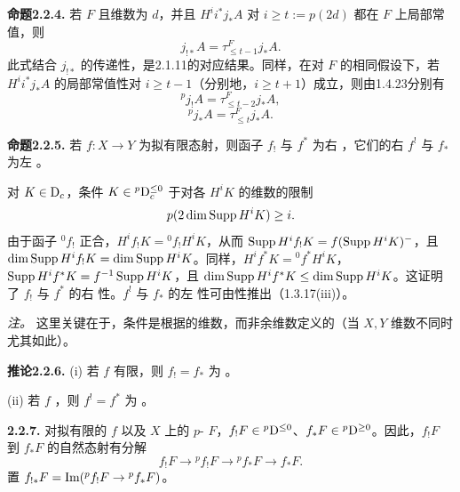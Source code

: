 \par\medskip\noindent\textbf{命题2.2.4.} 若 $F$ 且维数为 $d$，并且 $H^ii^*j_*A$ 对 $i\geq t:=p(2d)$ 都在 $F$ 上局部常值，则
\begin{equation*}
 j_{!*}A=\tau^F_{\leq t-1}j_*A.\tag{2.2.4.1}
\end{equation*}
此式结合 $j_{!*}$ 的传递性，是2.1.11的对应结果。同样，在对 $F$ 的相同假设下，若 $H^ii^*j_*A$ 的局部常值性对 $i\geq t-1$（分别地，$i\geq t+1$）成立，则由1.4.23分别有
\begin{equation*}
 {}^pj_!A=\tau^F_{\leq t-2}j_*A,\tag{2.2.4.2}
\end{equation*}
\begin{equation*}
 {}^pj_*A=\tau^F_{\leq t}j_*A.\tag{2.2.4.3}
\end{equation*}

\par\medskip\noindent\textbf{命题2.2.5.} 若 $f\colon X\to Y$ 为拟有限态射，则函子 $f_!$ 与 $f^*$ 为右 ，它们的右 $f^!$ 与 $f_*$ 为左 。

对 $K\in\mathrm{D}_c$，条件 $K\in{}^p\mathrm{D}_c^{\leq0}$ 于对各 $H^iK$ 的维数的限制
\[
 p(2\dim\operatorname{Supp} H^iK)\geq i.
\]
由于函子 ${}^0f_!$ 正合，$H^if_!K={}^0f_!H^iK$，从而 $\operatorname{Supp} H^if_!K=f(\operatorname{Supp} H^iK)^-$，且 $\dim\operatorname{Supp} H^if_!K=\dim\operatorname{Supp} H^iK$。同样，$H^if^*K={}^0f^*H^iK$，$\operatorname{Supp} H^if^*K=f^{-1}\operatorname{Supp} H^iK$，且 $\dim\operatorname{Supp} H^if^*K\leq\dim\operatorname{Supp} H^iK$。这证明了 $f_!$ 与 $f^*$ 的右 性。$f^!$ 与 $f_*$ 的左 性可由性推出（1.3.17(iii)）。

\emph{注。} 这里关键在于，条件是根据的维数，而非余维数定义的（当 $X,Y$ 维数不同时尤其如此）。

\par\medskip\noindent\textbf{推论2.2.6.} (i) 若 $f$ 有限，则 $f_!=f_*$ 为 。

(ii) 若 $f$ ，则 $f^!=f^*$ 为 。

\par\medskip\noindent\textbf{2.2.7.} 对拟有限的 $f$ 以及 $X$ 上的 $p$- $F$，$f_!F\in{}^p\mathrm{D}^{\leq0}$、$f_*F\in{}^p\mathrm{D}^{\geq0}$。因此，$f_!F$ 到 $f_*F$ 的自然态射有分解
\begin{equation*}
 f_!F\longrightarrow{}^pf_!F\longrightarrow{}^pf_*F\longrightarrow f_*F.\tag{2.2.7.1}
\end{equation*}
置 $f_{!*}F=\operatorname{Im}({}^pf_!F\to{}^pf_*F)$。


